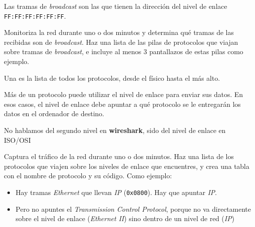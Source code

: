 \begin{homeworkProblem}

  Las tramas de \textit{broadcast} son las que tienen la dirección del nivel de enlace \texttt{FF:FF:FF:FF:FF:FF}.

  Monitoriza la red durante uno o dos minutos y determina qué tramas de las recibidas son de \textit{broadcast}. Haz una lista de las pilas de protocolos que viajan sobre tramas de \textit{broadcast}, e incluye al menos 3 pantallazos de estas pilas como ejemplo.

  
  \begin{adjustwidth}{2cm}{}
    \small{Una  es la lista de todos los protocolos, desde el físico hasta el más alto.}
  \end{adjustwidth}

\end{homeworkProblem}


\begin{homeworkProblem}
  Más de un protocolo puede utilizar el nivel de enlace para enviar sus datos. En esos casos, el nivel de enlace debe apuntar a qué protocolo se le entregarán los datos en el ordenador de destino.
  \begin{adjustwidth}{2cm}{}
  \small{No hablamos del segundo nivel en \textbf{wireshark}, sido del nivel de enlace en ISO/OSI}
  \end{adjustwidth}
  
  Captura el tráfico de la red durante uno o dos minutos. Haz una lista de los protocolos que viajen sobre los niveles de enlace que encuentres, y crea una tabla con el nombre de protocolo y su código. Como ejemplo:
  \begin{itemize}
  \item Hay tramas \textit{Ethernet} que llevan \textit{IP} (\texttt{0x0800}). Hay que apuntar \textit{IP}.
  \item Pero no apuntes el \textit{Transmission Control  Protocol}, porque no va directamente sobre el nivel de enlace (\textit{Ethernet II}) sino dentro de un nivel de red (\textit{IP})
  \end{itemize}
\end{homeworkProblem}


